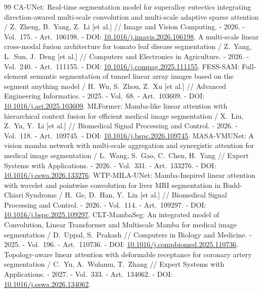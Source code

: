\documentclass[areasetadvanced]{scrartcl}
\begin{document}
\begin{thebibliography}{99}
	 CA-UNet: Real-time segmentation model for superalloy eutectics integrating direction-awared multi-scale convolution and multi-scale adaptive sparse attention / Z.~Zheng, B.~Yang, Z.~Li [et al.] // Image and Vision Computing. - 2026. - Vol.~175. - Art.~106198. - DOI: \href{https://doi.org/10.1016/j.imavis.2026.106198}{10.1016/j.imavis.2026.106198}.
	 A multi-scale linear cross-modal fusion architecture for tomato leaf disease segmentation / Z.~Yang, L.~Sun, J.~Deng [et al.] // Computers and Electronics in Agriculture. - 2026. - Vol.~240. - Art.~111155. - DOI: \href{https://doi.org/10.1016/j.compag.2025.111155}{10.1016/j.compag.2025.111155}.
	 FESS-SAM: Full-element semantic segmentation of tunnel linear array images based on the segment anything model / H.~Wu, S.~Zhou, Z.~Xu [et al.] // Advanced Engineering Informatics. - 2025. - Vol.~68. - Art.~103609. - DOI: \href{https://doi.org/10.1016/j.aei.2025.103609}{10.1016/j.aei.2025.103609}.
	 MLFormer: Mamba-like linear attention with hierarchical context fusion for efficient medical image segmentation / X.~Liu, Z.~Yu, Y.~Li [et al.] // Biomedical Signal Processing and Control. - 2026. - Vol.~118. - Art.~109745. - DOI: \href{https://doi.org/10.1016/j.bspc.2026.109745}{10.1016/j.bspc.2026.109745}.
	 MASA-VMUNet: A vision mamba network with multi-scale aggregation and synergistic attention for medical image segmentation / L.~Wang, S.~Gao, C.~Chen, H.~Yang // Expert Systems with Applications. - 2026. - Vol.~331. - Art.~133276. - DOI: \href{https://doi.org/10.1016/j.eswa.2026.133276}{10.1016/j.eswa.2026.133276}.
	 WTP-MILA-UNet: Mamba-Inspired linear attention with wavelet and pointwise convolution for liver MRI segmentation in Budd-Chiari Syndrome / H.~Ge, D.~Han, Y.~Lin [et al.] // Biomedical Signal Processing and Control. - 2026. - Vol.~114. - Art.~109297. - DOI: \href{https://doi.org/10.1016/j.bspc.2025.109297}{10.1016/j.bspc.2025.109297}.
	 CLT-MambaSeg: An integrated model of Convolution, Linear Transformer and Multiscale Mamba for medical image segmentation / D.~Uppal, S.~Prakash // Computers in Biology and Medicine. - 2025. - Vol.~196. - Art.~110736. - DOI: \href{https://doi.org/10.1016/j.compbiomed.2025.110736}{10.1016/j.compbiomed.2025.110736}.
	 Topology-aware linear attention with deformable receptance for coronary artery segmentation / C.~Yu, A.~Wulamu, T.~Zhang // Expert Systems with Applications. - 2027. - Vol.~333. - Art.~134062. - DOI: \href{https://doi.org/10.1016/j.eswa.2026.134062}{10.1016/j.eswa.2026.134062}.

\end{thebibliography}
\end{document}
